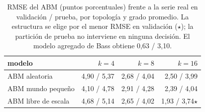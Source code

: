 \begin{table}[tb]
\centering
\caption{RMSE del ABM (puntos porcentuales) frente a la serie real en validación / prueba, por topología y grado promedio. La estructura se elige por el menor RMSE en validación ($\star$); la partición de prueba no interviene en ninguna decisión. El modelo agregado de Bass obtiene 0,63 / 3,10.}
\label{tab:calibracion}
\small
\setlength{\tabcolsep}{4pt}
\begin{tabular}{lrrr}
\toprule
modelo & $k=4$ & $k=8$ & $k=16$ \\
\midrule
ABM aleatoria & 4,90 / 5,37 & 2,68 / 4,04 & 2,50 / 3,99 \\
ABM mundo pequeño & 4,10 / 4,78 & 2,91 / 4,28 & 2,39 / 4,04 \\
ABM libre de escala & 4,68 / 5,14 & 2,65 / 4,02 & 1,93 / 3,74$\star$ \\
\bottomrule
\end{tabular}
\end{table}

